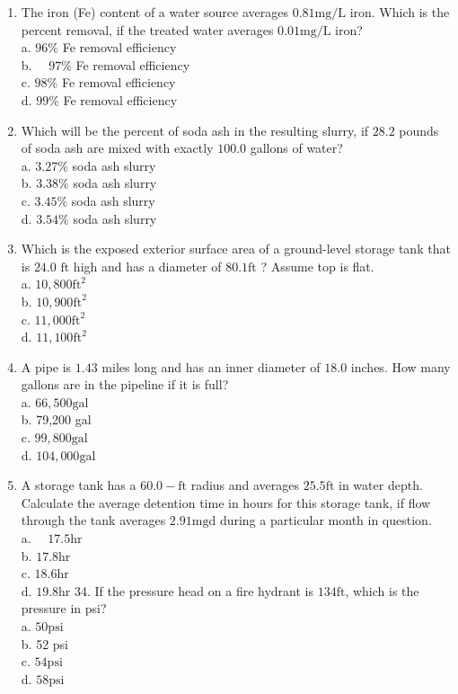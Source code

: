 \documentclass[10pt]{article}
\begin{document}
\begin{enumerate}
  \item The iron (Fe) content of a water source averages $0.81 \mathrm{mg} / \mathrm{L}$ iron. Which is the percent removal, if the treated water averages $0.01 \mathrm{mg} / \mathrm{L}$ iron?\\
a. $96 \%$ Fe removal efficiency\\
b. $\quad 97 \%$ Fe removal efficiency\\
c. $98 \%$ Fe removal efficiency\\
d. $99 \%$ Fe removal efficiency

  \item Which will be the percent of soda ash in the resulting slurry, if $28.2$ pounds of soda ash are mixed with exactly $100.0$ gallons of water?\\
a. $3.27 \%$ soda ash slurry\\
b. $3.38 \%$ soda ash slurry\\
c. $3.45 \%$ soda ash slurry\\
d. $3.54 \%$ soda ash slurry

  \item Which is the exposed exterior surface area of a ground-level storage tank that is $24.0$ $\mathrm{ft}$ high and has a diameter of $80.1 \mathrm{ft}$ ? Assume top is flat.\\
a. $10,800 \mathrm{ft}^{2}$\\
b. $10,900 \mathrm{ft}^{2}$\\
c. $11,000 \mathrm{ft}^{2}$\\
d. $11,100 \mathrm{ft}^{2}$

  \item A pipe is $1.43$ miles long and has an inner diameter of $18.0$ inches. How many gallons are in the pipeline if it is full?\\
a. $66,500 \mathrm{gal}$\\
b. 79,200 gal\\
c. $99,800 \mathrm{gal}$\\
d. $104,000 \mathrm{gal}$

  \item A storage tank has a $60.0-\mathrm{ft}$ radius and averages $25.5 \mathrm{ft}$ in water depth. Calculate the average detention time in hours for this storage tank, if flow through the tank averages $2.91 \mathrm{mgd}$ during a particular month in question.\\
a. $\quad 17.5 \mathrm{hr}$\\
b. $17.8 \mathrm{hr}$\\
c. $18.6 \mathrm{hr}$\\
d. $19.8 \mathrm{hr}$ 34. If the pressure head on a fire hydrant is $134 \mathrm{ft}$, which is the pressure in psi?\\
a. $50 \mathrm{psi}$\\
b. 52 psi\\
c. $54 \mathrm{psi}$\\
d. $58 \mathrm{psi}$


\end{enumerate}
\end{document}
